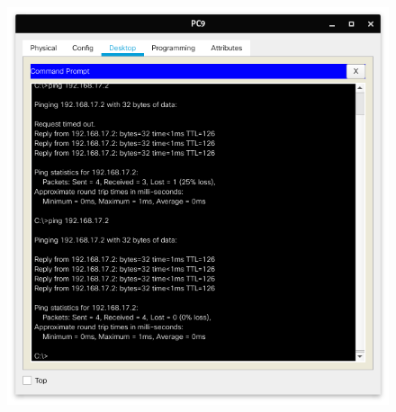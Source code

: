 \begin{figure}[H]
    \centering
    \includegraphics[width=0.8\linewidth]{images/scr9.png}
    \caption{}%
\end{figure}
